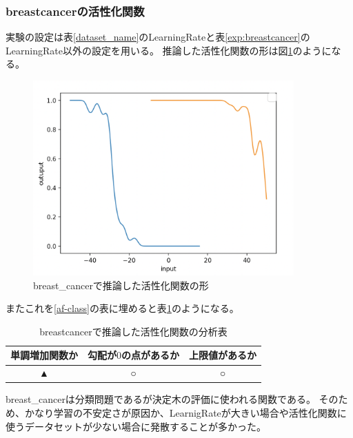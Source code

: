 \subsubsection{breastcancerの活性化関数}
実験の設定は表\ref{dataset_name}のLearningRateと表\ref{exp:breastcancer}のLearningRate以外の設定を用いる。
推論した活性化関数の形は図\ref{infer_breastcancer}のようになる。
\begin{figure}[hbtp]
    \begin{center}
        \includegraphics[width=10cm]{asset/breastcancer-0.01.png}
            \caption{breast\_cancerで推論した活性化関数の形}
            \label{infer_breastcancer}
    \end{center}
\end{figure}

またこれを\ref{af-class}の表に埋めると表\ref{anal_breastcancer}のようになる。
\begin{table}[htbp]
    \begin{center}
        \caption{breastcancerで推論した活性化関数の分析表}
        \label{anal_breastcancer}
        \vspace{2mm} 
        \begin{tabular}{ |c|c|c| }
        \hline
        単調増加関数か & 勾配が$ 0 $の点があるか & 上限値があるか   \\
        \hline
        ▲ & ○ & ○   \\
        \hline
        \end{tabular}
    \end{center}
\end{table}


breast\_cancerは分類問題であるが決定木の評価に使われる関数である。
そのため、かなり学習の不安定さが原因か、LearnigRateが大きい場合や活性化関数に使うデータセットが少ない場合に発散することが多かった。




